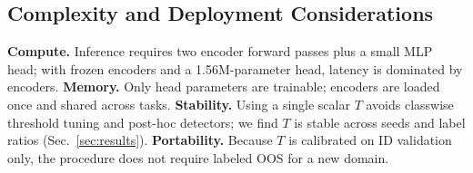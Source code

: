 \documentclass[journal,letterpaper]{IEEEtran}
\begin{document}
\subsection{Complexity and Deployment Considerations}
\textbf{Compute.} Inference requires two encoder forward passes plus a small MLP head; with frozen encoders and a 1.56M-parameter head, latency is dominated by encoders. \textbf{Memory.} Only head parameters are trainable; encoders are loaded once and shared across tasks. \textbf{Stability.} Using a single scalar $T$ avoids classwise threshold tuning and post-hoc detectors; we find $T$ is stable across seeds and label ratios (Sec.~\ref{sec:results}). \textbf{Portability.} Because $T$ is calibrated on ID validation only, the procedure does not require labeled OOS for a new domain.










%
%
\end{document}
